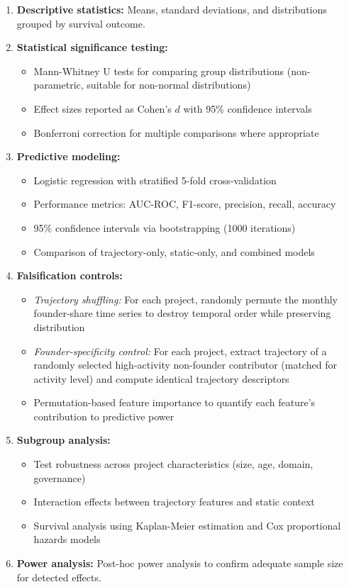 \documentclass[11pt,letterpaper]{article}
\begin{document}
\begin{enumerate}
  \item \textbf{Descriptive statistics:} Means, standard deviations, and distributions grouped by survival outcome.
  \item \textbf{Statistical significance testing:}
  \begin{itemize}
    \item Mann-Whitney U tests for comparing group distributions (non-parametric, suitable for non-normal distributions)
    \item Effect sizes reported as Cohen's $d$ with 95\% confidence intervals
    \item Bonferroni correction for multiple comparisons where appropriate
  \end{itemize}
  \item \textbf{Predictive modeling:}
  \begin{itemize}
    \item Logistic regression with stratified 5-fold cross-validation
    \item Performance metrics: AUC-ROC, F1-score, precision, recall, accuracy
    \item 95\% confidence intervals via bootstrapping (1000 iterations)
    \item Comparison of trajectory-only, static-only, and combined models
  \end{itemize}
  \item \textbf{Falsification controls:}
  \begin{itemize}
    \item \textit{Trajectory shuffling:} For each project, randomly permute the monthly founder-share time series to destroy temporal order while preserving distribution
    \item \textit{Founder-specificity control:} For each project, extract trajectory of a randomly selected high-activity non-founder contributor (matched for activity level) and compute identical trajectory descriptors
    \item Permutation-based feature importance to quantify each feature's contribution to predictive power
  \end{itemize}
  \item \textbf{Subgroup analysis:}
  \begin{itemize}
    \item Test robustness across project characteristics (size, age, domain, governance)
    \item Interaction effects between trajectory features and static context
    \item Survival analysis using Kaplan-Meier estimation and Cox proportional hazards models
  \end{itemize}
  \item \textbf{Power analysis:} Post-hoc power analysis to confirm adequate sample size for detected effects.
\end{enumerate}
\end{document}
